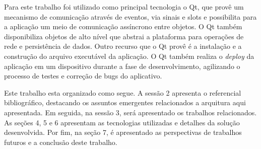 Para este trabalho foi utilizado como principal tecnologia o Qt, que provê um mecanismo de comunicação através de eventos, via sinais e slots e possibilita para a aplicação um meio de comunicação assíncrono entre objetos. O Qt também disponibiliza objetos de alto nível que abstrai a plataforma para operações de rede e persistência de dados. Outro recurso que o Qt provê é a instalação e a construção do arquivo executável da aplicação. O Qt também realiza o \textit{deploy} da aplicação em um dispositivo durante a fase de desenvolvimento, agilizando o processo de testes e correção de bugs do aplicativo.


Este trabalho esta organizado como segue. A sessão 2 apresenta o referencial bibliográfico, destacando os assuntos emergentes relacionados a arquitura aqui apresentada. Em seguida, na sessão 3, será apresentado os trabalhos relacionados. As seções 4, 5 e 6 apresentam as tecnologias utilizadas e detalhes da solução desenvolvida. Por fim, na seção 7, é apresentado as perspectivas de trabalhos futuros e a conclusão deste trabalho.